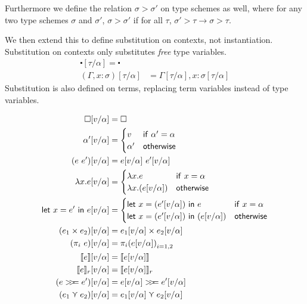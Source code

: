 Furthermore we define the relation $\sigma > \sigma'$ on type schemes as well,
where for any two type schemes $\sigma$ and $\sigma'$,
$\sigma > \sigma'$ if for all $\tau$, $\sigma' > \tau \rightarrow \sigma > \tau$.

We then extend this to define substitution on contexts, not
instantiation. Substitution on contexts only substitutes \emph{free}
type variables.
\begin{align*}
  \centerdot[\tau/\alpha] = \centerdot \\
  (\Gamma , x : \sigma) [\tau/\alpha] &= \Gamma[\tau/\alpha] , x : \sigma[\tau/\alpha]
\end{align*}
Substitution is also defined on terms, replacing term variables
instead of type variables.

\begin{align*}
  \square [v/\alpha] &= \square \\
  \alpha' [v/\alpha] &=
             \begin{cases}
               v & \mathsf{if} \ \alpha' = \alpha \\
               \alpha' & \mathsf{otherwise}
             \end{cases} \\
  (e \ e') [v/\alpha] &= e[v/\alpha] \ e'[v/\alpha] \\
  \lambda x . e [v/\alpha] &=
                  \begin{cases}
                    \lambda x . e & \mathsf{if} \ x = \alpha \\
                    \lambda x . (e [v/\alpha]) & \mathsf{otherwise}
                  \end{cases} \\
  \letin{x = e'}{e} [v/\alpha] &=
                               \begin{cases}
                                 \letin{x = (e' [v/\alpha])}{e} & \mathsf{if} \
                                 x = \alpha \\
                                 \letin{x = (e' [v/\alpha])}{(e [v/\alpha])}
                                 & \mathsf{otherwise}
                               \end{cases} \\  
  (e_1 \times e_2) [v/\alpha] &= e_1[v/\alpha] \times e_2[v/\alpha] \\
  (\pi_i \ e) [v/\alpha] &= {\pi_i (e [v/\alpha])}_{i = 1, 2} \\
  \lift{e} [v/\alpha] &= \lift{e[v/\alpha]} \\
  \use{r}{e} [v/\alpha] &= \use{r}{e[v/\alpha]} \\
  (e \bind e') [v/\alpha] &= e[v/\alpha] \bind e'[v/\alpha] \\
  (e_1 \curlyvee e_2) [v/\alpha] &= e_1[v/\alpha] \curlyvee e_2 [v/\alpha]
\end{align*}

